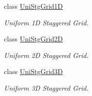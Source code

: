 \begin{DoxyCompactItemize}
class \hyperlink{classmtk_1_1UniStgGrid1D}{Uni\+Stg\+Grid1\+D}
\begin{DoxyCompactList}\small\item\em Uniform 1\+D Staggered Grid. \end{DoxyCompactList}\item 
class \hyperlink{classmtk_1_1UniStgGrid2D}{Uni\+Stg\+Grid2\+D}
\begin{DoxyCompactList}\small\item\em Uniform 2\+D Staggered Grid. \end{DoxyCompactList}\item 
class \hyperlink{classmtk_1_1UniStgGrid3D}{Uni\+Stg\+Grid3\+D}
\begin{DoxyCompactList}\small\item\em Uniform 3\+D Staggered Grid. \end{DoxyCompactList}\end{DoxyCompactItemize}
